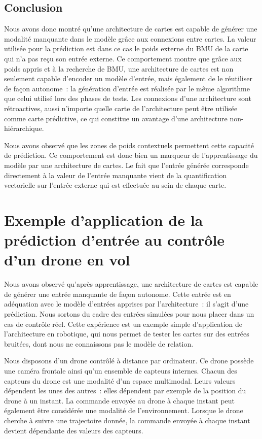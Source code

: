 \documentclass[../main]{subfiles}
\begin{document}
\subsection{Conclusion}

Nous avons donc montré qu'une architecture de cartes est capable de générer une modalité manquante dans le modèle grâce aux connexions entre cartes. La valeur utilisée pour la prédiction est dans ce cas le poids externe du BMU de la carte qui n'a pas reçu son entrée externe.
Ce comportement montre que grâce aux poids appris et à la recherche de BMU, une architecture de cartes est non seulement capable d'encoder un modèle d'entrée, mais également de le réutiliser de façon autonome~: la génération d'entrée est réalisée par le même algorithme que celui utilisé lors des phases de tests.
Les connexions d'une architecture sont rétroactives, aussi n'importe quelle carte de l'architecture peut être utilisée comme carte prédictive, ce qui constitue un avantage d'une architecture non-hiérarchique.

Nous avons observé que les zones de poids contextuels permettent cette capacité de prédiction. Ce comportement est donc bien un marqueur de l'apprentissage du modèle par une architecture de cartes. Le fait que l'entrée générée corresponde directement à la valeur de l'entrée manquante vient de la quantification vectorielle sur l'entrée externe qui est effectuée au sein de chaque carte.

\section{Exemple d'application de la prédiction d'entrée au contrôle d'un drone en vol}

Nous avons observé qu'après apprentissage, une architecture de cartes est capable de générer une entrée manquante de façon autonome. Cette entrée est en adéquation avec le modèle d'entrées apprises par l'architecture~: il s'agit d'une prédiction.
Nous sortons du cadre des entrées simulées pour nous placer dans un cas de contrôle réel. 
Cette expérience est un exemple simple d'application de l'architecture en robotique, qui nous permet de tester les cartes sur des entrées bruitées, dont nous ne connaissons pas le modèle de relation.

Nous disposons d'un drone contrôlé à distance par ordinateur. 
Ce drone possède une caméra frontale ainsi qu'un ensemble de capteurs internes. Chacun des capteurs du drone est une modalité d'un espace multimodal. Leurs valeurs dépendent les unes des autres~: elles dépendent par exemple de la position du drone à un instant.
La commande envoyée au drone à chaque instant peut également être considérée une modalité de l'environnement. 
Lorsque le drone cherche à suivre une trajectoire donnée, la commande envoyée à chaque instant devient dépendante des valeurs des capteurs.
\end{document}
